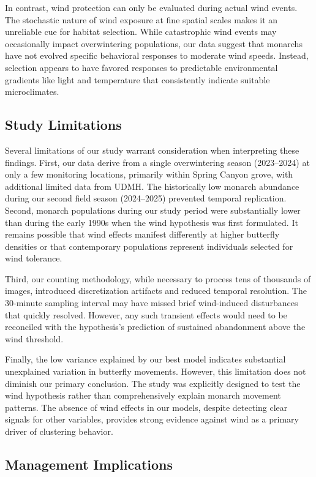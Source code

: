 In contrast, wind protection can only be evaluated during actual wind events. The stochastic nature of wind exposure at fine spatial scales makes it an unreliable cue for habitat selection. While catastrophic wind events may occasionally impact overwintering populations, our data suggest that monarchs have not evolved specific behavioral responses to moderate wind speeds. Instead, selection appears to have favored responses to predictable environmental gradients like light and temperature that consistently indicate suitable microclimates.

\subsection{Study Limitations}

Several limitations of our study warrant consideration when interpreting these findings. First, our data derive from a single overwintering season (2023--2024) at only a few monitoring locations, primarily within Spring Canyon grove, with additional limited data from UDMH. The historically low monarch abundance during our second field season (2024--2025) prevented temporal replication. Second, monarch populations during our study period were substantially lower than during the early 1990s when the wind hypothesis was first formulated. It remains possible that wind effects manifest differently at higher butterfly densities or that contemporary populations represent individuals selected for wind tolerance.

Third, our counting methodology, while necessary to process tens of thousands of images, introduced discretization artifacts and reduced temporal resolution. The 30-minute sampling interval may have missed brief wind-induced disturbances that quickly resolved. However, any such transient effects would need to be reconciled with the hypothesis's prediction of sustained abandonment above the wind threshold.

Finally, the low variance explained by our best model indicates substantial unexplained variation in butterfly movements. However, this limitation does not diminish our primary conclusion. The study was explicitly designed to test the wind hypothesis rather than comprehensively explain monarch movement patterns. The absence of wind effects in our models, despite detecting clear signals for other variables, provides strong evidence against wind as a primary driver of clustering behavior.

\subsection{Management Implications}

